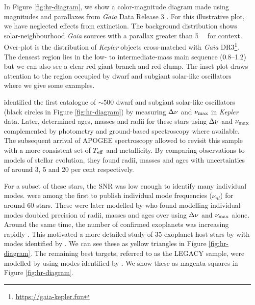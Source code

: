 In Figure \ref{fig:hr-diagram}, we show a color-magnitude diagram made using magnitudes and parallaxes from \emph{Gaia} Data Release 3 \citep[DR3;][]{GaiaCollaboration.Vallenari.ea2022}. For this illustrative plot, we have neglected effects from extinction. The background distribution shows solar-neighbourhood \emph{Gaia} sources with a parallax greater than \SI{5}{\milli\aarcsec} for context. Over-plot is the distribution of \emph{Kepler} objects cross-matched with \emph{Gaia} DR3\footnote{\url{https://gaia-kepler.fun}}. The densest region lies in the low- to intermediate-mass main sequence (\SIrange{0.8}{1.2}{\solarmass}) but we can also see a clear red giant branch and red clump. The inset plot draws attention to the region occupied by dwarf and subgiant solar-like oscillators where we give some examples.

\citet{Chaplin.Kjeldsen.ea2011} identified the first catalogue of \(\sim 500\) dwarf and subgiant solar-like oscillators (black circles in Figure \ref{fig:hr-diagram}) by measuring \({\Delta\nu}\) and \({\nu_\mathrm{max}}\) in \emph{Kepler} data. Later, \citet{Chaplin.Basu.ea2014} determined ages, masses and radii for these stars using \({\Delta\nu}\) and \({\nu_\mathrm{max}}\) complemented by photometry and ground-based spectroscopy where available. The subsequent arrival of APOGEE spectroscopy allowed \citet{Serenelli.Johnson.ea2017} to revisit this sample with a more consistent set of \({T_\mathrm{eff}}\) and metallicity. By comparing observations to models of stellar evolution, they found radii, masses and ages with uncertainties of around 3, 5 and 20 per cent respectively.

For a subset of these stars, the SNR was low enough to identify many individual modes. \citet{Appourchaux.Chaplin.ea2012} were among the first to publish individual mode frequencies (\(\nu_{nl}\)) for around 60 stars. These were later modelled by \citet{Metcalfe.Creevey.ea2014} who found modelling individual modes doubled precision of radii, masses and ages over using \({\Delta\nu}\) and \({\nu_\mathrm{max}}\) alone. Around the same time, the number of confirmed exoplanets was increasing rapidly \needcite. This motivated a more detailed study of 35 exoplanet host stars by \citet{SilvaAguirre.Davies.ea2015} with modes identified by \citet{Davies.SilvaAguirre.ea2016}. We can see these as yellow triangles in Figure \ref{fig:hr-diagram}. The remaining best targets, referred to as the LEGACY sample, were modelled by \citet{SilvaAguirre.Lund.ea2017} using modes identified by \citet{Lund.SilvaAguirre.ea2017}. We show these as magenta squares in Figure \ref{fig:hr-diagram}.

